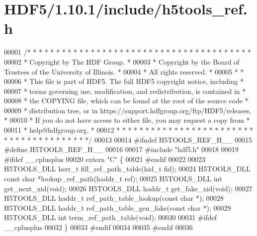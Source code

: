\hypertarget{_h_d_f5_21_810_81_2include_2h5tools__ref_8h_source}{}\section{H\+D\+F5/1.10.1/include/h5tools\+\_\+ref.h}
\label{_h_d_f5_21_810_81_2include_2h5tools__ref_8h_source}

\begin{DoxyCode}
00001 \textcolor{comment}{/* * * * * * * * * * * * * * * * * * * * * * * * * * * * * * * * * * * * * * *}
00002 \textcolor{comment}{ * Copyright by The HDF Group.                                               *}
00003 \textcolor{comment}{ * Copyright by the Board of Trustees of the University of Illinois.         *}
00004 \textcolor{comment}{ * All rights reserved.                                                      *}
00005 \textcolor{comment}{ *                                                                           *}
00006 \textcolor{comment}{ * This file is part of HDF5.  The full HDF5 copyright notice, including     *}
00007 \textcolor{comment}{ * terms governing use, modification, and redistribution, is contained in    *}
00008 \textcolor{comment}{ * the COPYING file, which can be found at the root of the source code       *}
00009 \textcolor{comment}{ * distribution tree, or in https://support.hdfgroup.org/ftp/HDF5/releases.  *}
00010 \textcolor{comment}{ * If you do not have access to either file, you may request a copy from     *}
00011 \textcolor{comment}{ * help@hdfgroup.org.                                                        *}
00012 \textcolor{comment}{ * * * * * * * * * * * * * * * * * * * * * * * * * * * * * * * * * * * * * * */}
00013 
00014 \textcolor{preprocessor}{#ifndef H5TOOLS\_REF\_H\_\_}
00015 \textcolor{preprocessor}{#define H5TOOLS\_REF\_H\_\_}
00016 
00017 \textcolor{preprocessor}{#include "hdf5.h"}
00018 
00019 \textcolor{preprocessor}{#ifdef \_\_cplusplus}
00020 \textcolor{keyword}{extern} \textcolor{stringliteral}{"C"} \{
00021 \textcolor{preprocessor}{#endif}
00022 
00023 H5TOOLS\_DLL herr\_t      fill\_ref\_path\_table(hid\_t fid);
00024 H5TOOLS\_DLL \textcolor{keyword}{const} \textcolor{keywordtype}{char} *lookup\_ref\_path(haddr\_t ref);
00025 H5TOOLS\_DLL \textcolor{keywordtype}{int}         get\_next\_xid(\textcolor{keywordtype}{void});
00026 H5TOOLS\_DLL haddr\_t     get\_fake\_xid(\textcolor{keywordtype}{void});
00027 H5TOOLS\_DLL haddr\_t     ref\_path\_table\_lookup(\textcolor{keyword}{const} \textcolor{keywordtype}{char} *);
00028 H5TOOLS\_DLL haddr\_t     ref\_path\_table\_gen\_fake(\textcolor{keyword}{const} \textcolor{keywordtype}{char} *);
00029 H5TOOLS\_DLL \textcolor{keywordtype}{int}         term\_ref\_path\_table(\textcolor{keywordtype}{void});
00030 
00031 \textcolor{preprocessor}{#ifdef \_\_cplusplus}
00032 \}
00033 \textcolor{preprocessor}{#endif}
00034 
00035 \textcolor{preprocessor}{#endif}
00036 
\end{DoxyCode}
